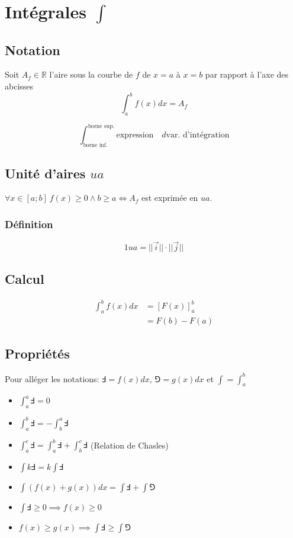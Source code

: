 \documentclass{article}
\newcommand{\R}{\mathds{R}}
\begin{document}
\newpage
\label{integrales}
\section{Intégrales $\int$}

\subsection{Notation}

Soit $A_f \in \R$ l'aire sous la courbe de $f$ de $x = a$ à $x = b$ par rapport à l'axe des abcisses
\[\int_a^b f(x) dx = A_f\]

\[\int_\text{borne inf.}^\text{borne sup.} \text{expression}\quad d\text{var. d'intégration}\]

\subsection{Unité d'aires $ua$}

$\forall x \in [a; b] \: f(x) \geq 0 \land b \geq a \iff A_f$ est exprimée en $ua$.

\subsubsection{Définition}

$$
1 ua = ||\vec i||\cdot ||\vec j||
$$

\subsection{Calcul}

\begin{equation*}
    \begin{split}
        \int_a^b f(x) dx &= [F(x)]_a^b \\
                         &= F(b) - F(a)
    \end{split}
\end{equation*}

\subsection{Propriétés}

Pour alléger les notations: $\Finv = f(x)dx$, $\Game = g(x)dx$ et $\int = \int_a^b$

\begin{itemize}
    \item $\int_a^a \Finv = 0$
    \item $\int_a^b \Finv = -\int_b^a \Finv$
    \item $\int_a^c \Finv = \int_a^b \Finv + \int_b^c \Finv$   (Relation de Chasles)
    \item $\int k\Finv = k\int \Finv$
    \item $\int (f(x) + g(x))dx = \int \Finv + \int \Game$
    \item $\int \Finv \geq 0 \implies f(x) \geq 0$
    \item $f(x) \geq g(x) \implies \int \Finv \geq \int \Game$
\end{itemize}
\end{document}

